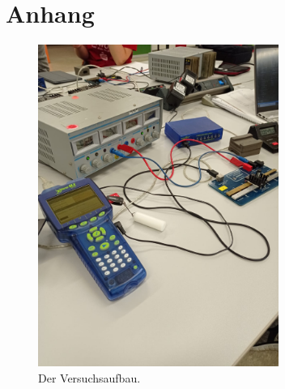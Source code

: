 \section{Anhang}

    \begin{figure}[h]
        \centering
        \includegraphics[width=0.7\textwidth]{latex/images/aufbau.jpeg}
        \caption{Der Versuchsaufbau.}
        \label{img:mess1}
      \end{figure}
  